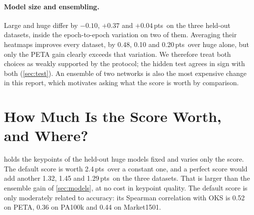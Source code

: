 \documentclass[10pt,twocolumn,letterpaper]{article}
\newcommand{\pts}{\,pts}
\begin{document}
\paragraph{Model size and ensembling.} Large and huge differ by $-0.10$, $+0.37$ and $+0.04$\pts\ on the three held-out datasets, inside the epoch-to-epoch variation on two of them. Averaging their heatmaps improves every dataset, by 0.48, 0.10 and 0.20\pts\ over huge alone, but only the PETA gain clearly exceeds that variation. We therefore treat both choices as weakly supported by the protocol; the hidden test agrees in sign with both (\cref{sec:test}). An ensemble of two networks is also the most expensive change in this report, which motivates asking what the score is worth by comparison.

\section{How Much Is the Score Worth, and Where?}
\label{sec:score}

\begin{table}[t]
\centering\small
\setlength{\tabcolsep}{3.2pt}
\caption{OKS AP ($\times100$) with the keypoints of the held-out huge models fixed and different scores. ``Failures moved last'' keeps the default order but places every prediction with OKS $<0.5$ at the end.}
\label{tab:choices}
\end{table}

 holds the keypoints of the held-out huge models fixed and varies only the score. The default score is worth 2.4\pts\ over a constant one, and a perfect score would add another 1.32, 1.45 and 1.29\pts\ on the three datasets. That is larger than the ensemble gain of \cref{sec:models}, at no cost in keypoint quality. The default score is only moderately related to accuracy: its Spearman correlation with OKS is 0.52 on PETA, 0.36 on PA100k and 0.44 on Market1501.
\end{document}
